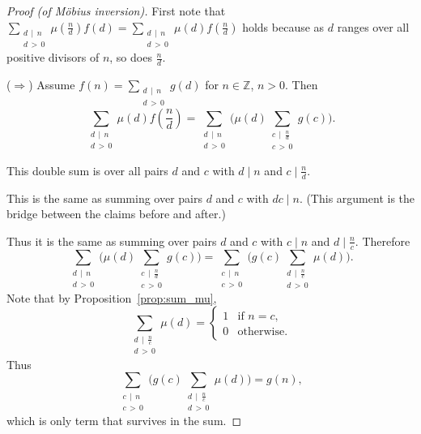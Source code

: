 \documentclass{amsbook}
\theoremstyle{plain}
\theoremstyle{definition}
\theoremstyle{remark}
\numberwithin{equation}{chapter}
\numberwithin{figure}{chapter}
\newcommand{\Z}{\mathbb{Z}}
\begin{document}
\begin{proof}[Proof {\rm (of M\"obius inversion)}]
  First note that $\sum_{\substack{d \, \mid \, n \\ d \, > \, 0}} \mu \left(\frac{n}d\right) f(d) = \sum_{\substack{d \, \mid \, n \\ d \, > \, 0}} \mu (d) f\left(\frac{n}d\right)$ holds because as $d$ ranges over all positive divisors of $n$, so does $\frac{n}d$.

  ($\Rightarrow$) Assume $f(n) = \sum_{\substack{d \, \mid \, n \\ d \, > \, 0}} g(d)$ for $n \in \Z$, $n > 0$. Then
  \[
    \sum_{\substack{d \, \mid \, n \\ d \, > \, 0}} \mu (d) f\left( \frac{n}d \right) = \sum_{\substack{d \, \mid \, n \\ d \, > \, 0}} \Bigg( \mu (d) \sum_{\substack{c \, \mid \, \frac{n}d \\ c \, > \, 0}} g(c) \Bigg).
  \]

  This double sum is over all pairs $d$ and $c$ with $d \mid n$ and $c \mid \frac{n}d$.

  This is the same as summing over pairs $d$ and $c$ with $dc \mid n$. (This argument is the bridge between the claims before and after.)

  Thus it is the same as summing over pairs $d$ and $c$ with $c \mid n$ and $d \mid \frac{n}c$. Therefore
  \[
    \sum_{\substack{d \, \mid \, n \\ d \, > \, 0}} \Bigg( \mu (d) \sum_{\substack{c \, \mid \, \frac{n}d \\ c \, > \, 0}} g(c) \Bigg) =
    \sum_{\substack{c \, \mid \, n \\ c \, > \, 0}} \Bigg( g (c) \sum_{\substack{d \, \mid \, \frac{n}c \\ d \, > \, 0}} \mu (d) \Bigg).
    \]
    Note that by Proposition~\ref{prop:sum_mu},
    \[
      \sum_{\substack{d \, \mid \, \frac{n}c \\ d \, > \, 0}} \mu (d) =
      \left\{
      \begin{array}{rl}
        1 & \text{if $n = c$,} \\
        0 & \text{otherwise.}
            \end{array} \right.
    \]
    Thus
    \[
      \sum_{\substack{c \, \mid \, n \\ c \, > \, 0}} \Bigg( g (c) \sum_{\substack{d \, \mid \, \frac{n}c \\ d \, > \, 0}} \mu (d) \Bigg) =
      g(n),
    \]
    which is only term that survives in the sum.


\end{proof}
\end{document}
